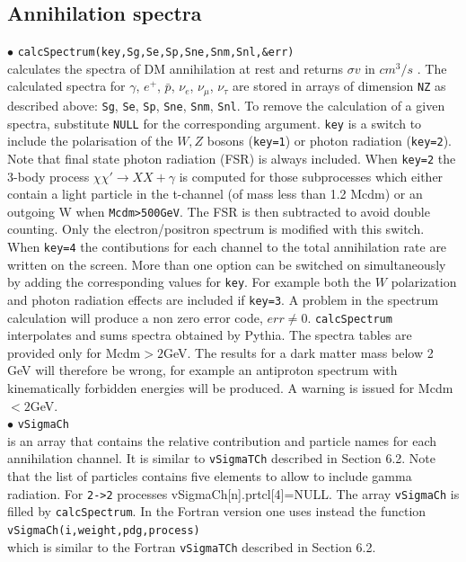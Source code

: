 \documentclass[12pt,a4paper]{article}
\begin{document}
\subsection{Annihilation spectra}
$\bullet$ \verb|calcSpectrum(key,Sg,Se,Sp,Sne,Snm,Snl,&err)|\\
calculates  the spectra  of DM annihilation 
at rest and returns $\sigma v$ in $cm^3/s$ . The calculated spectra
for $\gamma$, $e^+$, $\bar{p}$, $\nu_e$, $\nu_{\mu}$, $\nu_{\tau}$ 
are stored in arrays of dimension \verb|NZ| as described above: \verb|Sg|, \verb|Se|, \verb|Sp|, \verb|Sne|, \verb|Snm|, \verb|Snl|. 
 To remove the calculation of a given spectra, substitute  
\verb|NULL| for the corresponding argument. 
\verb|key| is a switch to include the polarisation of the  $W,Z$ bosons (\verb|key=1|) or
 photon radiation (\verb|key=2|).  
 Note that final state photon radiation (FSR) is always included.
When \verb|key=2| the 3-body  process $\chi\chi'\rightarrow XX +\gamma$ is computed for those subprocesses which either contain a light particle in the t-channel (of mass less than 1.2 Mcdm) or an outgoing W when \verb|Mcdm>500GeV|. The FSR is then subtracted to avoid double counting.
Only the electron/positron spectrum is modified with this switch.
When \verb|key=4| the contibutions  for each  channel to the total
annihilation rate  are written on the screen. More than one option
can be switched on simultaneously by adding the corresponding values for \verb|key|. 
For example both the $W$ polarization and photon radiation effects  are included if
\verb|key=3|.
A problem in the spectrum calculation will produce a non zero error code, $err\neq
0$. {\tt calcSpectrum} interpolates and sums spectra obtained
by Pythia. The spectra tables are provided only for Mcdm$>2$GeV. The results for a dark matter
mass below 2 GeV will therefore be wrong, for example an antiproton
spectrum  with  kinematically forbidden energies will be produced. A warning is issued for Mcdm$<2$GeV. \\ 
$\bullet$ \verb|vSigmaCh| \\
is an array that contains the relative contribution and particle names for each
annihilation channel. It is similar to  {\tt vSigmaTCh}
described in Section 6.2. Note that   the list of particles contains five elements to allow to include  gamma radiation. For \verb|2->2| processes vSigmaCh[n].prtcl[4]=NULL. The array {\tt vSigmaCh} is filled by 
{\tt calcSpectrum}. In the Fortran version one uses instead
the function\\
\noindent \verb|vSigmaCh(i,weight,pdg,process)|\\
which  is similar to the Fortran  {\tt vSigmaTCh} described in Section 6.2.
\end{document}
